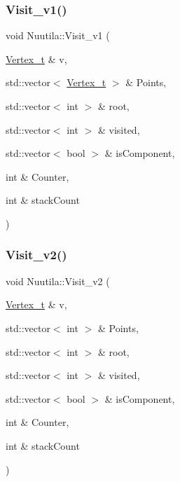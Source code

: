 \mbox{\label{class_nuutila_a83b47177cf452e80b3ceaf064ff59840_a83b47177cf452e80b3ceaf064ff59840}} 
\subsubsection{\texorpdfstring{Visit\+\_\+v1()}{Visit\_v1()}}
{\footnotesize\ttfamily void Nuutila\+::\+Visit\+\_\+v1 (\begin{DoxyParamCaption}\item[{\hyperlink{class_graph_component_ae67114a6ce5a001dc35e1996e1b45aa0_ae67114a6ce5a001dc35e1996e1b45aa0}{Vertex\+\_\+t} \&}]{v,  }\item[{std\+::vector$<$ \hyperlink{class_graph_component_ae67114a6ce5a001dc35e1996e1b45aa0_ae67114a6ce5a001dc35e1996e1b45aa0}{Vertex\+\_\+t} $>$ \&}]{Points,  }\item[{std\+::vector$<$ int $>$ \&}]{root,  }\item[{std\+::vector$<$ int $>$ \&}]{visited,  }\item[{std\+::vector$<$ bool $>$ \&}]{is\+Component,  }\item[{int \&}]{Counter,  }\item[{int \&}]{stack\+Count }\end{DoxyParamCaption})}

\mbox{\label{class_nuutila_afc7a8c27d8de17ac2679f839ff8c2749_afc7a8c27d8de17ac2679f839ff8c2749}} 
\subsubsection{\texorpdfstring{Visit\+\_\+v2()}{Visit\_v2()}}
{\footnotesize\ttfamily void Nuutila\+::\+Visit\+\_\+v2 (\begin{DoxyParamCaption}\item[{\hyperlink{class_graph_component_ae67114a6ce5a001dc35e1996e1b45aa0_ae67114a6ce5a001dc35e1996e1b45aa0}{Vertex\+\_\+t} \&}]{v,  }\item[{std\+::vector$<$ int $>$ \&}]{Points,  }\item[{std\+::vector$<$ int $>$ \&}]{root,  }\item[{std\+::vector$<$ int $>$ \&}]{visited,  }\item[{std\+::vector$<$ bool $>$ \&}]{is\+Component,  }\item[{int \&}]{Counter,  }\item[{int \&}]{stack\+Count }\end{DoxyParamCaption})}



